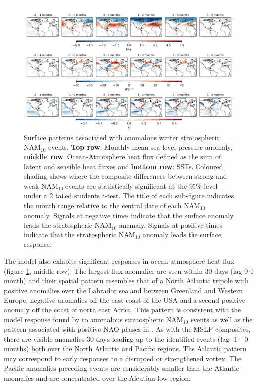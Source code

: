 \begin{center}
\begin{figure}[h!]
\noindent\includegraphics[width = \linewidth]{Figures/Figures-surface/in_season_response_NAM_combined.png}
\caption{Surface patterns associated with anomalous winter stratospheric NAM$_{10}$ events. \textbf{Top row}: Monthly mean sea level pressure anomaly, \textbf{middle row}: Ocean-Atmosphere heat flux defined as the sum of latent and sensible heat fluxes and \textbf{bottom row}: SSTs. Coloured shading shows where the composite differences between strong and weak NAM$_{10}$ events are statistically significant at the 95\% level under a 2 tailed students t-test. The title of each sub-figure indicates the month range relative to the central date of each NAM$_{10}$ anomaly. Signals at negative times indicate that the surface anomaly leads the stratospheric NAM$_{10}$ anomaly. Signals at positive  times indicate that the stratospheric NAM$_{10}$ anomaly leads the surface response.}
\label{fig:surface_comp_all}
\end{figure}
\end{center}

The model also exhibits significant responses in ocean-atmosphere heat flux (figure \ref{fig:surface_comp_all}, middle row). The largest flux anomalies are seen within 30 days (lag 0-1 month) and their spatial pattern resembles that of a North Atlantic tripole with positive anomalies over the Labrador sea and between Greenland and Western Europe, negative anomalies off the east coast of the USA and a second positive anomaly off the coast of north east Africa. This pattern is consistent with the model response found by \cite{reichlerStratospheric2012} to anomalous stratospheric NAM$_{10}$ events as well as the pattern associated with positive NAO phases in \cite{delworthImpact2016}. As with the MSLP composites, there are visible anomalies 30 days leading up to the identified events (lag -1 - 0 months) both over the North Atlantic and Pacific regions. The Atlantic pattern may correspond to early responses to a disrupted or strengthened vortex. The Pacific anomalies preceding events are considerably smaller than the Atlantic anomalies and are concentrated over the Aleutian low region.

